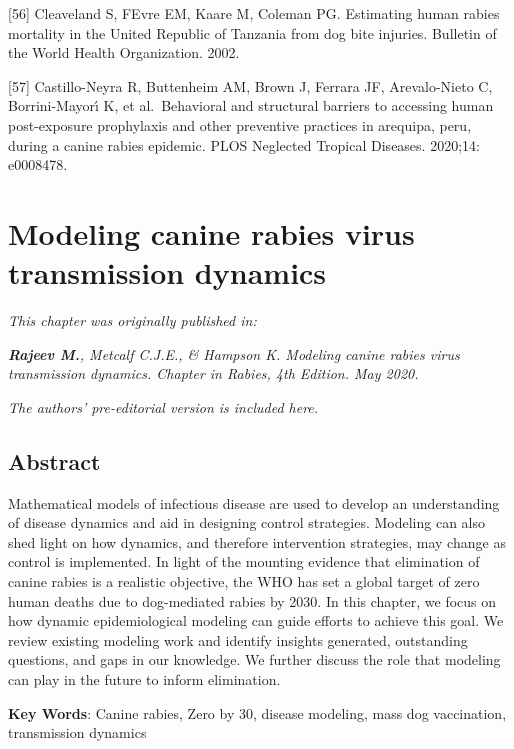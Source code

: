 \documentclass[
  oneside]{book}
\begin{document}
{[}56{]} Cleaveland S, FEvre EM, Kaare M, Coleman PG. Estimating human
rabies mortality in the United Republic of Tanzania from dog bite
injuries. Bulletin of the World Health Organization. 2002.

{[}57{]} Castillo-Neyra R, Buttenheim AM, Brown J, Ferrara JF, Arevalo-Nieto
C, Borrini-Mayorı́ K, et al.~Behavioral and structural barriers to
accessing human post-exposure prophylaxis and other preventive practices
in arequipa, peru, during a canine rabies epidemic. PLOS Neglected
Tropical Diseases. 2020;14: e0008478.

\hypertarget{modeling-canine-rabies-virus-transmission-dynamics}{%
\chapter{Modeling canine rabies virus transmission dynamics}\label{modeling-canine-rabies-virus-transmission-dynamics}}

\emph{This chapter was originally published in:}

\emph{\textbf{Rajeev M.}, Metcalf C.J.E., \& Hampson K. Modeling canine rabies virus transmission dynamics. Chapter in Rabies, 4th Edition. May 2020.}

\emph{The authors' pre-editorial version is included here.}

\newpage
\setlength{\parskip}{2em}

\hypertarget{abstract-2}{%
\section*{Abstract}\label{abstract-2}}

Mathematical models of infectious disease are used to develop an
understanding of disease dynamics and aid in designing control
strategies. Modeling can also shed light on how dynamics, and therefore
intervention strategies, may change as control is implemented. In light
of the mounting evidence that elimination of canine rabies is a
realistic objective, the WHO has set a global target of zero human
deaths due to dog-mediated rabies by 2030. In this chapter, we focus on
how dynamic epidemiological modeling can guide efforts to achieve this
goal. We review existing modeling work and identify insights generated,
outstanding questions, and gaps in our knowledge. We further discuss the
role that modeling can play in the future to inform elimination.

\textbf{Key Words}: Canine rabies, Zero by 30, disease modeling, mass dog
vaccination, transmission dynamics
\end{document}
